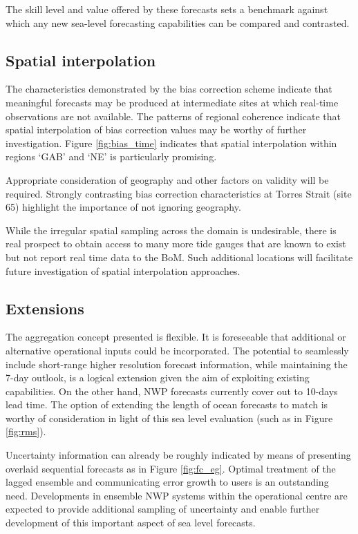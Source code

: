 The skill level and value offered by these forecasts sets a benchmark against which any new sea-level forecasting capabilities can be compared and contrasted.  

\subsection{Spatial interpolation}
The characteristics demonstrated by the bias correction scheme indicate that meaningful forecasts may be produced at intermediate sites at which real-time observations are not available.
The patterns of regional coherence indicate that spatial interpolation of bias correction values may be worthy of further investigation.
Figure \ref{fig:bias_time} indicates that spatial interpolation within regions `GAB' and `NE' is particularly promising.

Appropriate consideration of geography and other factors on validity will be required.
Strongly contrasting bias correction characteristics at Torres Strait (site 65) highlight the importance of not ignoring geography.

While the irregular spatial sampling across the domain is undesirable, there is real prospect to obtain access to many more tide gauges that are known to exist but not report real time data to the BoM.   
Such additional locations will facilitate future investigation of spatial interpolation approaches.    


\subsection{Extensions}
The aggregation concept presented is flexible.
It is foreseeable that additional or alternative operational inputs could be incorporated. 
The potential to seamlessly include short-range higher resolution forecast information, while maintaining the 7-day outlook, is a logical extension given the aim of exploiting existing capabilities.
On the other hand, NWP forecasts currently cover out to 10-days lead time. The option of extending the length of ocean forecasts to match is worthy of consideration in light of this sea level evaluation (such as in Figure \ref{fig:rms}).

Uncertainty information can already be roughly indicated by means of presenting overlaid sequential forecasts as in Figure \ref{fig:fc_eg}.
Optimal treatment of the lagged ensemble and communicating error growth to users is an outstanding need.
Developments in ensemble NWP systems within the operational centre are expected to provide additional sampling of uncertainty and enable further development of this important aspect of sea level forecasts.  

